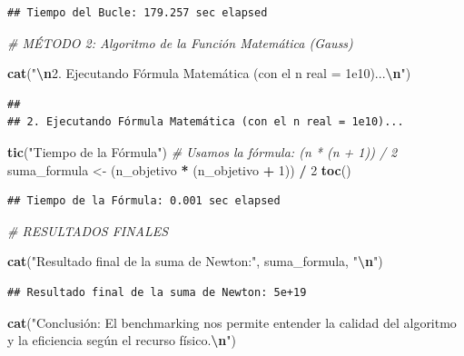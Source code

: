 \documentclass[]{llncs}
\newenvironment{Shaded}{\begin{snugshade}}{\end{snugshade}}
\newcommand{\CommentTok}[1]{\textcolor[rgb]{0.56,0.35,0.01}{\textit{#1}}}
\newcommand{\DecValTok}[1]{\textcolor[rgb]{0.00,0.00,0.81}{#1}}
\newcommand{\FunctionTok}[1]{\textcolor[rgb]{0.13,0.29,0.53}{\textbf{#1}}}
\newcommand{\NormalTok}[1]{#1}
\newcommand{\OtherTok}[1]{\textcolor[rgb]{0.56,0.35,0.01}{#1}}
\newcommand{\SpecialCharTok}[1]{\textcolor[rgb]{0.81,0.36,0.00}{\textbf{#1}}}
\newcommand{\StringTok}[1]{\textcolor[rgb]{0.31,0.60,0.02}{#1}}
\begin{document}
\begin{verbatim}
## Tiempo del Bucle: 179.257 sec elapsed
\end{verbatim}

\begin{Shaded}
\begin{Highlighting}[]
\CommentTok{\# MÉTODO 2: Algoritmo de la Función Matemática (Gauss)}

\FunctionTok{cat}\NormalTok{(}\StringTok{"}\SpecialCharTok{\textbackslash{}n}\StringTok{2. Ejecutando Fórmula Matemática (con el n real = 1e10)...}\SpecialCharTok{\textbackslash{}n}\StringTok{"}\NormalTok{)}
\end{Highlighting}
\end{Shaded}

\begin{verbatim}
## 
## 2. Ejecutando Fórmula Matemática (con el n real = 1e10)...
\end{verbatim}

\begin{Shaded}
\begin{Highlighting}[]
\FunctionTok{tic}\NormalTok{(}\StringTok{"Tiempo de la Fórmula"}\NormalTok{)}
\CommentTok{\# Usamos la fórmula: (n * (n + 1)) / 2}
\NormalTok{suma\_formula }\OtherTok{\textless{}{-}}\NormalTok{ (n\_objetivo }\SpecialCharTok{*}\NormalTok{ (n\_objetivo }\SpecialCharTok{+} \DecValTok{1}\NormalTok{)) }\SpecialCharTok{/} \DecValTok{2}
\FunctionTok{toc}\NormalTok{()}
\end{Highlighting}
\end{Shaded}

\begin{verbatim}
## Tiempo de la Fórmula: 0.001 sec elapsed
\end{verbatim}

\begin{Shaded}
\begin{Highlighting}[]
\CommentTok{\# RESULTADOS FINALES}

\FunctionTok{cat}\NormalTok{(}\StringTok{"Resultado final de la suma de Newton:"}\NormalTok{, suma\_formula, }\StringTok{"}\SpecialCharTok{\textbackslash{}n}\StringTok{"}\NormalTok{)}
\end{Highlighting}
\end{Shaded}

\begin{verbatim}
## Resultado final de la suma de Newton: 5e+19
\end{verbatim}

\begin{Shaded}
\begin{Highlighting}[]
\FunctionTok{cat}\NormalTok{(}\StringTok{"Conclusión: El benchmarking nos permite entender la calidad }
\StringTok{del algoritmo y la eficiencia según el recurso físico.}\SpecialCharTok{\textbackslash{}n}\StringTok{"}\NormalTok{)}
\end{Highlighting}
\end{Shaded}
\end{document}
